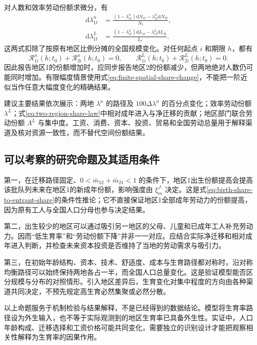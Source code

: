 \documentclass[UTF8,a4paper,zihao=-4,fontset=windows]{ctexart}
\numberwithin{equation}{section}
\newcommand{\dd}{\mathrm{d}}
\begin{document}
对人数和效率劳动份额求微分，有
\begin{align}
 \dd\lambda^n_{1t}&=\frac{(1-\lambda^n_{1t})\dd N_{1t}
 -\lambda^n_{1t}\dd N_{2t}}{N_t},\\
 \dd\lambda^L_{1t}&=\frac{(1-\lambda^L_{1t})\dd L_{1t}
 -\lambda^L_{1t}\dd L_{2t}}{L_t}.
 \label{eq:two-region-share-differential}
\end{align}
这两式扣除了按原有地区比例分摊的全国规模变化。对任何起点 $i$ 和期限 $h$，都有
\begin{equation}
 \mathcal R^n_{1i}(h;t_0)+\mathcal R^n_{2i}(h;t_0)=0,\qquad
 \mathcal R^L_{1i}(h;t_0)+\mathcal R^L_{2i}(h;t_0)=0.
 \label{eq:two-region-spatial-zero-sum}
\end{equation}
因此报告地区1的份额增加时，应同步报告地区2的份额减少，但两地绝对人数仍可能同时增加。有限幅度情景使用式\eqref{eq:finite-spatial-share-change}，不能把一阶近似当作任意大幅度变化的精确结果。

建议主要结果依次展示：两地 $\lambda^n$ 的路径及 $100\Delta\lambda^n$ 的百分点变化；效率劳动份额 $\lambda^L$；式\eqref{eq:two-region-share-law}中相对成年进入与净迁移的贡献；地区部门联合劳动份额 $\Lambda^L$ 与集中度。工资、消费、资本、投资、贸易和全国劳动总量用于解释渠道及核对资源一致性，而不替代空间份额结果。

\subsection{可以考察的研究命题及其适用条件}
第一，在迁移路径固定、$0<\bar m_{12}+\bar m_{21}<1$ 的条件下，地区1出生份额提高会提高该批队列未来在地区1的新成年份额，影响强度由 $\xi_m^J$ 决定。这是式\eqref{eq:birth-share-to-entrant-share}的条件性推论；它不直接保证地区1全部成年劳动力的份额提高，因为原有工人与全国人口分母也参与决定结果。

第二，出生较少的地区可以通过吸引另一地区的父母、儿童和已成年工人补充劳动力。因而“低生育率”和“劳动份额下降”并非一一对应。应结合实际净迁移和相对成年进入判断，并检查未来资本投资是否维持了当地的劳动需求与吸引力。

第三，在初始年龄结构、资本、技术、舒适度、成本与生育路径都对称时，沿对称均衡路径可以始终保持两地各占一半，而全国人口总量变化。这是验证模型能否区分规模与分布的对照情形。引入地区差异后，生育变化对集中程度的方向由各种渠道共同决定，不预先规定高生育必然集聚或必然分散。

以上命题服务于机制检验与结果解释，不是已经得到的数据结论。模型将生育率路径设为外生输入，也不等于实际观测到的地区生育率已具备外生性。实证中，人口年龄构成、迁移选择和工资价格可能共同变化，需要独立的识别设计才能把观察相关性解释为生育率的因果作用。
\end{document}
